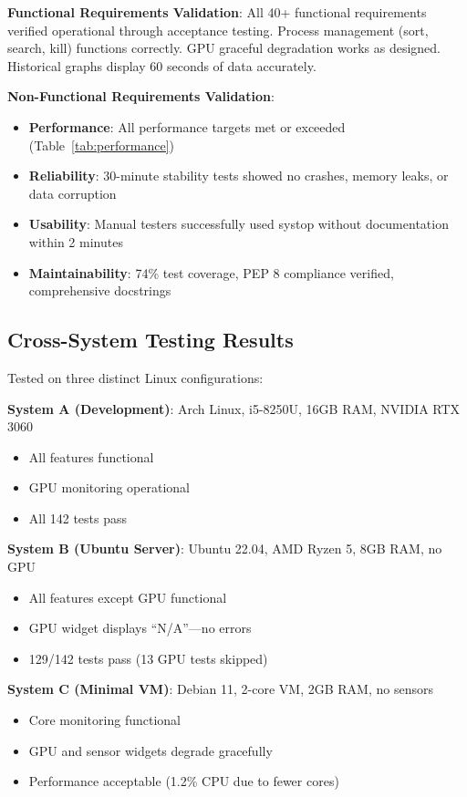 \documentclass[12pt,a4paper,oneside]{report}
\begin{document}
\textbf{Functional Requirements Validation}: All 40+ functional requirements verified operational through acceptance testing. Process management (sort, search, kill) functions correctly. GPU graceful degradation works as designed. Historical graphs display 60 seconds of data accurately.

\textbf{Non-Functional Requirements Validation}:
\begin{itemize}
    \item \textbf{Performance}: All performance targets met or exceeded (Table~\ref{tab:performance})
    \item \textbf{Reliability}: 30-minute stability tests showed no crashes, memory leaks, or data corruption
    \item \textbf{Usability}: Manual testers successfully used systop without documentation within 2 minutes
    \item \textbf{Maintainability}: 74\% test coverage, PEP 8 compliance verified, comprehensive docstrings
\end{itemize}

\subsection{Cross-System Testing Results}

Tested on three distinct Linux configurations:

\textbf{System A (Development)}: Arch Linux, i5-8250U, 16GB RAM, NVIDIA RTX 3060
\begin{itemize}
    \item All features functional
    \item GPU monitoring operational
    \item All 142 tests pass
\end{itemize}

\textbf{System B (Ubuntu Server)}: Ubuntu 22.04, AMD Ryzen 5, 8GB RAM, no GPU
\begin{itemize}
    \item All features except GPU functional
    \item GPU widget displays ``N/A''---no errors
    \item 129/142 tests pass (13 GPU tests skipped)
\end{itemize}

\textbf{System C (Minimal VM)}: Debian 11, 2-core VM, 2GB RAM, no sensors
\begin{itemize}
    \item Core monitoring functional
    \item GPU and sensor widgets degrade gracefully
    \item Performance acceptable (1.2\% CPU due to fewer cores)
\end{itemize}
\end{document}
